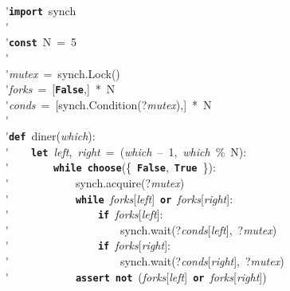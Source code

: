\'\>\texttt{\textbf{import}}~synch\\

\'\>\\

\'\>\texttt{\textbf{const}}~N~=~5\\

\'\>\\

\'\>\textit{mutex}~=~synch.Lock()\\

\'\>\textit{forks}~=~[\texttt{\textbf{False}},]~*~N\\

\'\>\textit{conds}~=~[synch.Condition(?\textit{mutex}),]~*~N\\

\'\>\\

\'\>\texttt{\textbf{def}}~diner(\textit{which}):\\

\'\>~~~~\texttt{\textbf{let}}~\textit{left},~\textit{right}~=~(\textit{which}~--~1,~\textit{which}~\%~N):\\

\'\>~~~~~~~~\texttt{\textbf{while}}~\texttt{\textbf{choose}}(\{~\texttt{\textbf{False}},~\texttt{\textbf{True}}~\}):\\

\'\>~~~~~~~~~~~~synch.acquire(?\textit{mutex})\\

\'\>~~~~~~~~~~~~\texttt{\textbf{while}}~\textit{forks}[\textit{left}]~\texttt{\textbf{or}}~\textit{forks}[\textit{right}]:\\

\'\>~~~~~~~~~~~~~~~~\texttt{\textbf{if}}~\textit{forks}[\textit{left}]:\\

\'\>~~~~~~~~~~~~~~~~~~~~synch.wait(?\textit{conds}[\textit{left}],~?\textit{mutex})\\

\'\>~~~~~~~~~~~~~~~~\texttt{\textbf{if}}~\textit{forks}[\textit{right}]:\\

\'\>~~~~~~~~~~~~~~~~~~~~synch.wait(?\textit{conds}[\textit{right}],~?\textit{mutex})\\

\'\>~~~~~~~~~~~~\texttt{\textbf{assert}}~\texttt{\textbf{not}}~(\textit{forks}[\textit{left}]~\texttt{\textbf{or}}~\textit{forks}[\textit{right}])\\

